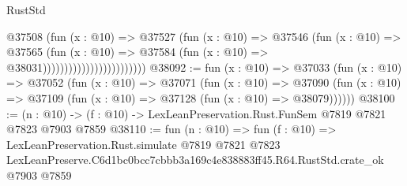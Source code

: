 \begin{lexlean}{RustStd}
\begin{coremodule}
                                        @37508
                                          (fun (x : @10) =>
                                          @37527
                                            (fun (x : @10) =>
                                            @37546
                                              (fun (x : @10) =>
                                              @37565
                                                (fun (x : @10) =>
                                                @37584
                                                  (fun (x : @10) => @38031))))))))))))))))))))))))
@38092 := fun (x : @10) =>
  @37033
    (fun (x : @10) =>
    @37052
      (fun (x : @10) =>
      @37071
        (fun (x : @10) =>
        @37090 (fun (x : @10) => @37109 (fun (x : @10) => @37128 (fun (x : @10) => @38079))))))
@38100 := (n : @10) -> (f : @10) -> LexLeanPreservation.Rust.FunSem @7819 @7821 @7823 @7903 @7859
@38110 := fun (n : @10) =>
  fun (f : @10) =>
  LexLeanPreservation.Rust.simulate
    @7819
    @7821
    @7823
    LexLeanPreserve.C6d1bc0bcc7cbbb3a169c4e838883ff45.R64.RustStd.crate_ok
    @7903
    @7859
\end{coremodule}
\end{lexlean}
